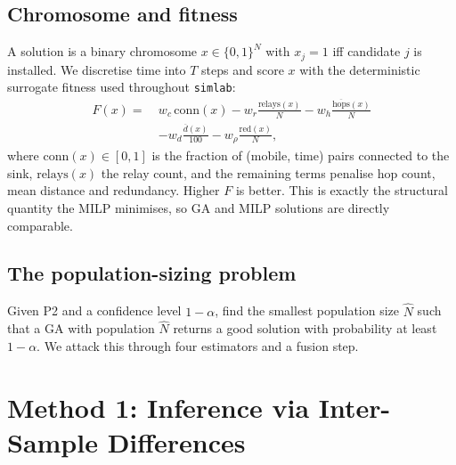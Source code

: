 \documentclass[conference]{IEEEtran}
\newcommand{\Nhat}{\hat{N}}
\begin{document}
\subsection{Chromosome and fitness}
A solution is a binary chromosome $x\in\{0,1\}^{N}$ with $x_j=1$ iff candidate
$j$ is installed. We discretise time into $T$ steps and score $x$ with the
deterministic surrogate fitness used throughout \texttt{simlab}:
\begin{align}
F(x) =\ & w_c\,\mathrm{conn}(x) - w_r\tfrac{\mathrm{relays}(x)}{N}
        - w_h\tfrac{\overline{\mathrm{hops}}(x)}{N} \nonumber\\
       & - w_d\tfrac{\overline{d}(x)}{100} - w_\rho\tfrac{\mathrm{red}(x)}{N},
\label{eq:fitness}
\end{align}
where $\mathrm{conn}(x)\in[0,1]$ is the fraction of (mobile, time) pairs
connected to the sink, $\mathrm{relays}(x)$ the relay count, and the remaining
terms penalise hop count, mean distance and redundancy. Higher $F$ is better.
This is exactly the structural quantity the MILP minimises, so GA and MILP
solutions are directly comparable.

\subsection{The population-sizing problem}
Given P2 and a confidence level $1-\alpha$, find the smallest population size
$\Nhat$ such that a GA with population $\Nhat$ returns a good solution with
probability at least $1-\alpha$. We attack this through four estimators and a
fusion step.

\section{Method 1: Inference via Inter-Sample Differences}
\label{sec:m1}
\end{document}
